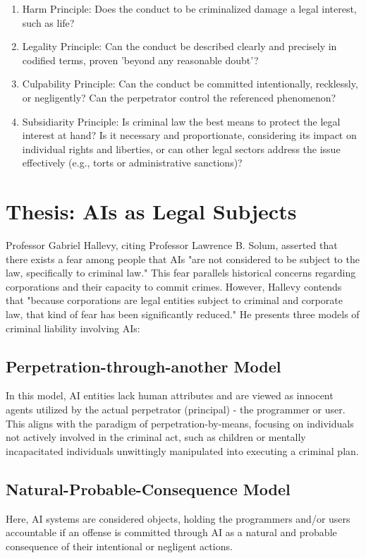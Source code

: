 \begin{enumerate}
    \item Harm Principle: Does the conduct to be criminalized damage a legal interest, such as life?
    \item Legality Principle: Can the conduct be described clearly and precisely in codified terms, proven 'beyond any reasonable doubt'?
    \item Culpability Principle: Can the conduct be committed intentionally, recklessly, or negligently? Can the perpetrator control the referenced phenomenon?
    \item Subsidiarity Principle: Is criminal law the best means to protect the legal interest at hand? Is it necessary and proportionate, considering its impact on individual rights and liberties, or can other legal sectors address the issue effectively (e.g., torts or administrative sanctions)?
\end{enumerate}

\section{Thesis: AIs as Legal Subjects}

Professor Gabriel Hallevy, citing Professor Lawrence B. Solum, asserted that there exists a fear among people that AIs "are not considered to be subject to the law, specifically to criminal law." This fear parallels historical concerns regarding corporations and their capacity to commit crimes. However, Hallevy contends that "because corporations are legal entities subject to criminal and corporate law, that kind of fear has been significantly reduced." He presents three models of criminal liability involving AIs:

\subsection{Perpetration-through-another Model}
In this model, AI entities lack human attributes and are viewed as innocent agents utilized by the actual perpetrator (principal) - the programmer or user. This aligns with the paradigm of perpetration-by-means, focusing on individuals not actively involved in the criminal act, such as children or mentally incapacitated individuals unwittingly manipulated into executing a criminal plan.

\subsection{Natural-Probable-Consequence Model}
Here, AI systems are considered objects, holding the programmers and/or users accountable if an offense is committed through AI as a natural and probable consequence of their intentional or negligent actions.

